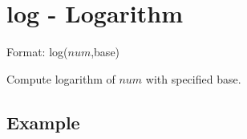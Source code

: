 
%

\section{log - Logarithm\label{sect:log}}

Format: log($num$,base)

Compute logarithm of $num$ with specified base. 


\subsection*{Example}


%
